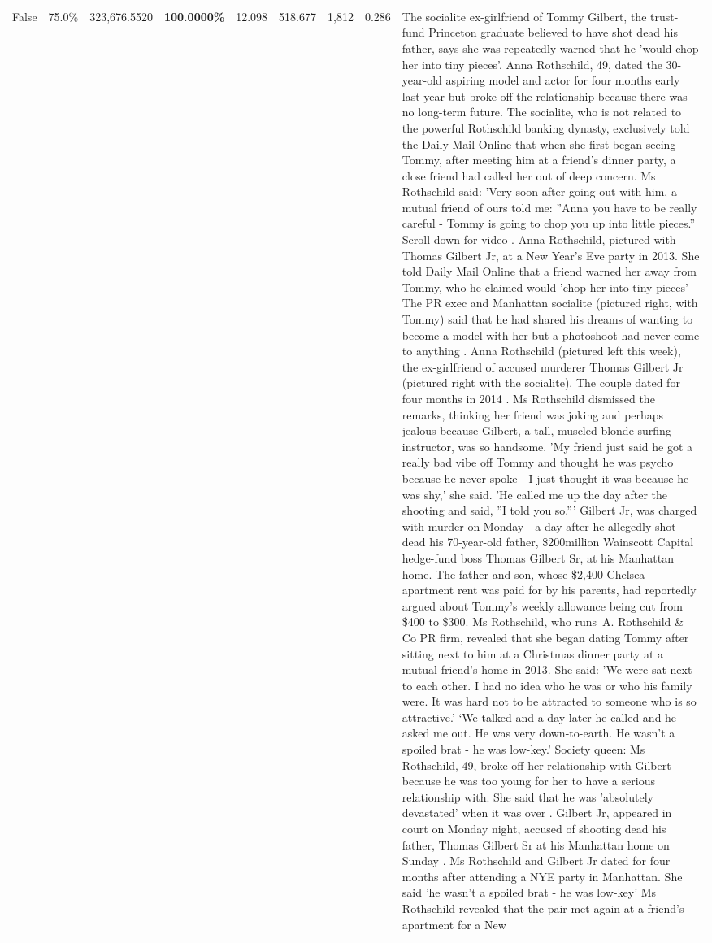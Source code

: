 \begin{table}[H]
\begin{tabular}{lllrlllll}
False & 75.0\% & 323,676.5520 & \bfseries \color{red} 100.0000\% & 12.098 & 518.677 & 1,812 & 0.286 & The socialite ex-girlfriend of Tommy Gilbert, the trust-fund Princeton graduate believed to have shot dead his father, says she was repeatedly warned that he 'would chop her into tiny pieces'. Anna Rothschild, 49, dated the 30-year-old aspiring model and actor for four months early last year but broke off the relationship because there was no long-term future. The socialite, who is not related to the powerful Rothschild banking dynasty, exclusively told the Daily Mail Online that when she first began seeing Tommy, after meeting him at a friend's dinner party, a close friend had called her out of deep concern. Ms Rothschild said: 'Very soon after going out with him, a mutual friend of ours told me: ''Anna you have to be really careful - Tommy is going to chop you up into little pieces.'' Scroll down for video . Anna Rothschild, pictured with Thomas Gilbert Jr, at a New Year's Eve party in 2013. She told Daily Mail Online that a friend warned her away from Tommy, who he claimed would 'chop her into tiny pieces' The PR exec and Manhattan socialite (pictured right, with Tommy) said that he had shared his dreams of wanting to become a model with her but a photoshoot had never come to anything . Anna Rothschild (pictured left this week), the ex-girlfriend of accused murderer Thomas Gilbert Jr (pictured right with the socialite). The couple dated for four months in 2014 . Ms Rothschild dismissed the remarks, thinking her friend was joking and perhaps jealous because Gilbert, a tall, muscled blonde surfing instructor, was so handsome. 'My friend just said he got a really bad vibe off Tommy and thought he was psycho because he never spoke - I just thought it was because he was shy,' she said. 'He called me up the day after the shooting and said, ''I told you so.''' Gilbert Jr, was charged with murder on Monday - a day after he allegedly shot dead his 70-year-old father, \$200million Wainscott Capital hedge-fund boss Thomas Gilbert Sr, at his Manhattan home. The father and son, whose \$2,400 Chelsea apartment rent was paid for by his parents, had reportedly argued about Tommy's weekly allowance being cut from \$400 to \$300. Ms Rothschild, who runs A. Rothschild \& Co PR firm, revealed that she began dating Tommy after sitting next to him at a Christmas dinner party at a mutual friend's home in 2013. She said: 'We were sat next to each other. I had no idea who he was or who his family were. It was hard not to be attracted to someone who is so attractive.' ‘We talked and a day later he called and he asked me out. He was very down-to-earth. He wasn’t a spoiled brat - he was low-key.’ Society queen: Ms Rothschild, 49, broke off her relationship with Gilbert because he was too young for her to have a serious relationship with. She said that he was 'absolutely devastated' when it was over . Gilbert Jr, appeared in court on Monday night, accused of shooting dead his father, Thomas Gilbert Sr at his Manhattan home on Sunday . Ms Rothschild and Gilbert Jr dated for four months after attending a NYE party in Manhattan. She said 'he wasn't a spoiled brat - he was low-key' Ms Rothschild revealed that the pair met again at a friend’s apartment for a New 
\end{tabular}
\end{table}
